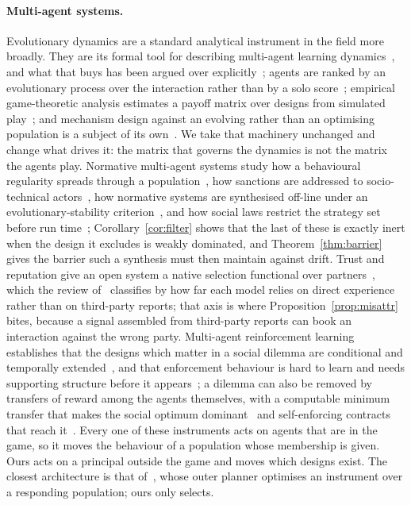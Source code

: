\paragraph{Multi-agent systems.}
Evolutionary dynamics are a standard analytical instrument in the field more
broadly. They are its formal tool for describing multi-agent learning
dynamics~\citep{bloembergen2015evolutionary}, and what that buys has been
argued over explicitly~\citep{tuyls2007what}; agents are ranked by an
evolutionary process over the interaction rather than by a solo
score~\citep{omidshafiei2019alpharank}; empirical game-theoretic analysis
estimates a payoff matrix over designs from simulated
play~\citep{tuyls2020bounds}; and mechanism design against an evolving rather
than an optimising population is a subject of its
own~\citep{phelps2010evolutionary}. We take that machinery unchanged and
change what drives it: the matrix that governs the dynamics is not the matrix
the agents play. Normative multi-agent systems study how a behavioural
regularity spreads through a population~\citep{morrismartin2019norm}, how
sanctions are addressed to socio-technical actors~\citep{nardin2016sanctions},
how normative systems are synthesised off-line under an evolutionary-stability
criterion~\citep{morales2018offline}, and how social laws restrict the strategy
set before run time~\citep{shoham1995social}; Corollary~\ref{cor:filter} shows
that the last of these is exactly inert when the design it excludes is weakly
dominated, and Theorem~\ref{thm:barrier} gives the barrier such a synthesis
must then maintain against drift. Trust and reputation give an open system a
native selection functional over partners~\citep{huynh2006integrated}, which
the review of~\citet{pinyol2013computational} classifies by how far each model
relies on direct experience rather than on third-party reports; that axis is
where Proposition~\ref{prop:misattr} bites, because a signal assembled from
third-party reports can book an interaction against the wrong party.
Multi-agent reinforcement learning establishes that the designs which matter
in a social dilemma are conditional and temporally
extended~\citep{leibo2017sequential}, and that enforcement behaviour is hard
to learn and needs supporting structure before it
appears~\citep{koster2022spurious}; a dilemma can also be removed by transfers
of reward among the agents themselves, with a computable minimum transfer that
makes the social optimum dominant~\citep{willis2024minimal} and self-enforcing
contracts that reach it~\citep{haupt2024contracts}. Every one of these
instruments acts on agents that are in the game, so it moves the behaviour of
a population whose membership is given. Ours acts on a principal outside the
game and moves which designs exist. The closest architecture is that
of~\citet{zheng2022aieconomist}, whose outer planner optimises an instrument
over a responding population; ours only selects.


